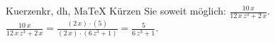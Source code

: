 \begin{MAufgabe}{Kuerzen}{kr, dh, MaTeX}
K\"urzen Sie soweit m\"oglich: $\frac{10\, x}{12\, x\, z^3 + 2\, x}$.\\ 
\ifLsg\MLoesung
\quad $\frac{10\, x}{12\, x\, z^3 + 2\, x}=\frac{(2\, x)\cdot(5)}{(2\, x)\cdot(6\, z^3 + 1)}=\frac{5}{6\, z^3 + 1}$.\else\relax\fi
 \end{MAufgabe}